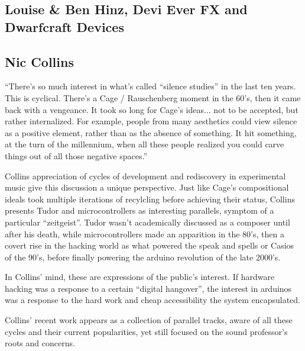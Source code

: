 \subsection{Louise \& Ben Hinz, Devi Ever FX and Dwarfcraft Devices}




\subsection{Nic Collins}

``There’s so much interest in what’s called ``silence studies'' in the last ten years. This is cyclical. There’s a Cage / Rauschenberg moment in the 60’s, then it came back with a vengeance. It took so long for Cage’s ideas... not to be accepted, but rather internalized. For example, people from many aesthetics could view silence as a positive element, rather than as the absence of something. It hit something, at the turn of the millennium, when all these people realized you could carve things out of all those negative spaces.''

Collins appreciation of cycles of development and rediscovery in experimental music give this discussion a unique perspective. Just like Cage's compositional ideals took multiple iterations of recylcling before achieving their status, Collins presents Tudor and microcontrollers as interesting parallels, symptom of a particular ``zeitgeist''. Tudor wasn't academically discussed as a composer until after his death, while microcontrollers made an apparition in the 80's, then a covert rise in the hacking world as what powered the speak and spells or Casios of the 90's, before finally powering the arduino revolution of the late 2000's.

In Collins' mind, these are expressions of the public's interest. If hardware hacking was a response to a certain ``digital hangover'', the interest in arduinos was a response to the hard work and cheap accessibility the system encapsulated. 

Collins' recent work appears as a collection of parallel tracks, aware of all these cycles and their current popularities, yet still focused on the sound professor's roots and concerns. 

